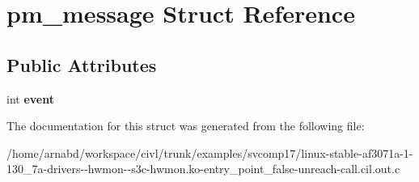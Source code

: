 \hypertarget{structpm__message}{}\section{pm\+\_\+message Struct Reference}
\label{structpm__message}
\subsection*{Public Attributes}
\begin{DoxyCompactItemize}
\item 
\hypertarget{structpm__message_adfb47536ac4054f9931bcd5f441a3a45}{}int {\bfseries event}\label{structpm__message_adfb47536ac4054f9931bcd5f441a3a45}

\end{DoxyCompactItemize}


The documentation for this struct was generated from the following file\+:\begin{DoxyCompactItemize}
\item 
/home/arnabd/workspace/civl/trunk/examples/svcomp17/linux-\/stable-\/af3071a-\/1-\/130\+\_\+7a-\/drivers-\/-\/hwmon-\/-\/s3c-\/hwmon.\+ko-\/entry\+\_\+point\+\_\+false-\/unreach-\/call.\+cil.\+out.\+c\end{DoxyCompactItemize}
